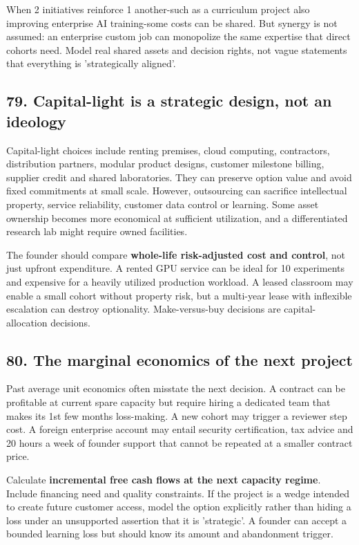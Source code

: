 When 2 initiatives reinforce 1 another-such as a curriculum project also improving enterprise AI training-some costs can be shared. But synergy is not assumed: an enterprise custom job can monopolize the same expertise that direct cohorts need. Model real shared assets and decision rights, not vague statements that everything is 'strategically aligned'.

\subsection{79. Capital-light is a strategic design, not an ideology}


Capital-light choices include renting premises, cloud computing, contractors, distribution partners, modular product designs, customer milestone billing, supplier credit and shared laboratories. They can preserve option value and avoid fixed commitments at small scale. However, outsourcing can sacrifice intellectual property, service reliability, customer data control or learning. Some asset ownership becomes more economical at sufficient utilization, and a differentiated research lab might require owned facilities.

The founder should compare \textbf{whole-life risk-adjusted cost and control}, not just upfront expenditure. A rented GPU service can be ideal for 10 experiments and expensive for a heavily utilized production workload. A leased classroom may enable a small cohort without property risk, but a multi-year lease with inflexible escalation can destroy optionality. Make-versus-buy decisions are capital-allocation decisions.

\subsection{80. The marginal economics of the next project}


Past average unit economics often misstate the next decision. A contract can be profitable at current spare capacity but require hiring a dedicated team that makes its 1st few months loss-making. A new cohort may trigger a reviewer step cost. A foreign enterprise account may entail security certification, tax advice and 20 hours a week of founder support that cannot be repeated at a smaller contract price.

Calculate \textbf{incremental free cash flows at the next capacity regime}. Include financing need and quality constraints. If the project is a wedge intended to create future customer access, model the option explicitly rather than hiding a loss under an unsupported assertion that it is 'strategic'. A founder can accept a bounded learning loss but should know its amount and abandonment trigger.

